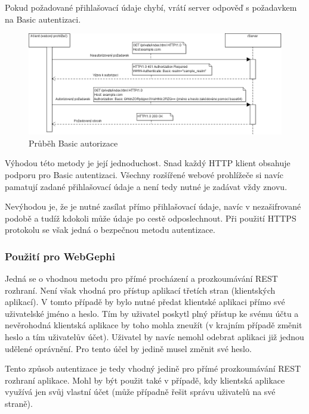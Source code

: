 \documentclass[thesis=M,czech]{FITthesis}[2014/05/6]
\begin{document}
Pokud požadované přihlašovací údaje chybí, vrátí server odpověď s požadavkem na Basic autentizaci.

\begin{figure}\centering
 	\includegraphics[width=1\textwidth]{images/diagram/auth_basic}
 	\caption[Průběh Basic autorizace]{Průběh Basic autorizace}\label{fig:auth-basic}
\end{figure}

Výhodou této metody je její jednoduchost. Snad každý HTTP klient obsahuje podporu pro Basic autentizaci. Všechny rozšířené webové prohlížeče si navíc pamatují 
zadané přihlašovací údaje a není tedy nutné je zadávat vždy znovu.

Nevýhodou je, že je nutné zasílat přímo přihlašovací údaje, navíc v nezašifrované podobě a tudíž kdokoli může údaje po cestě odposlechnout. Při použití HTTPS protokolu se však
jedná o bezpečnou metodu autentizace.

\subsubsection{Použití pro WebGephi}
Jedná se o vhodnou metodu pro přímé procházení a prozkoumávání REST rozhraní. Není však vhodná pro přístup aplikací třetích stran (klientských aplikací).
V tomto případě by bylo nutné předat klientské aplikaci přímo své uživatelské jméno a heslo. Tím by uživatel poskytl plný přístup ke svému účtu a nevěrohodná klientská
aplikace by toho mohla zneužít (v krajním případě změnit heslo a tím  uživatelův účet). Uživatel by navíc nemohl odebrat aplikaci již jednou udělené oprávnění. 
Pro tento účel by jedině musel změnit své heslo.

Tento způsob autentizace je tedy vhodný jedině pro přímé prozkoumávání REST rozhraní aplikace. Mohl by být použit také v případě,
kdy klientská aplikace využívá jen svůj vlastní účet (může případně řešit správu uživatelů na své straně). 
\end{document}

